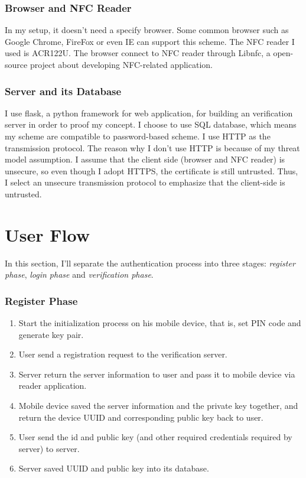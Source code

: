 \begin{CJK}{Bg5}{bsmi}
\subsubsection{Browser and NFC Reader}
In my setup, it doesn't need a specify browser. Some common browser such as Google Chrome, FireFox or even IE can support this scheme. The NFC reader I used is ACR122U. The browser connect to NFC reader through Libnfc\cite{libnfc}, a open-source project about developing NFC-related application.

\subsubsection{Server and its Database}

I use flask, a python framework for web application, for building an verification server in order to proof my concept. I choose to use SQL database, which means my scheme are compatible to password-based scheme. I use HTTP as the transmission protocol. The reason why I don't use HTTP is because of my threat model assumption. I assume that the client side (browser and NFC reader) is unsecure, so even though I adopt HTTPS, the certificate is still untrusted. Thus, I select an unsecure transmission protocol to emphasize that the client-side is untrusted.

\section{User Flow}

In this section, I'll separate the authentication process into three stages: \emph{register phase}, \emph{login phase} and \emph{verification phase}.

\subsubsection{Register Phase}

\begin{enumerate}
\item Start the initialization process on his mobile device, that is, set PIN code and generate key pair.
\item User send a registration request to the verification server.
\item Server return the server information to user and pass it to mobile device via reader application.
\item Mobile device saved the server information and the private key together, and return the device UUID and corresponding public key back to user.
\item User send the id and public key (and other required credentials required by server) to server.
\item Server saved UUID and public key into its database.
\end{enumerate}


\end{CJK}
